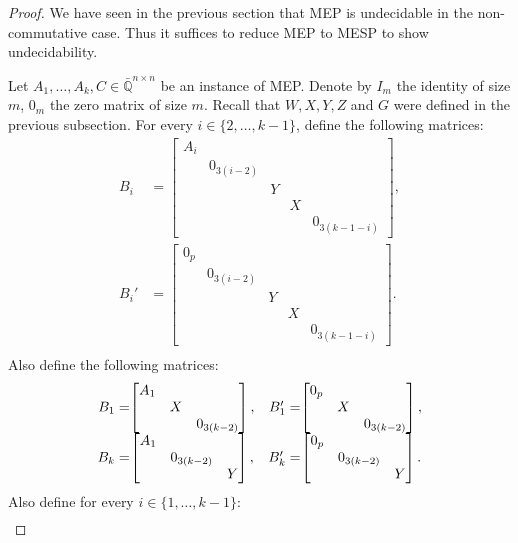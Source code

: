 \begin{proof}
We have seen in the previous section that MEP is undecidable in the non-commutative
case. Thus it suffices to reduce MEP to MESP to show undecidability.

Let $A_1,\ldots,A_k,C\in\bar{\mathbb{Q}}^{n\times n}$ be an instance of MEP. Denote by $I_m$ the identity of size $m$,
$0_m$ the zero matrix of size $m$. Recall that $W,X,Y,Z$ and $G$ were defined in the previous
subsection. For every $i\in\{2,\ldots,k-1\}$, define the following matrices:
\begin{align*}
B_i&=\begin{bmatrix}A_i&&&&\\&0_{3(i-2)}&&&\\&&Y&&\\&&&X&\\&&&&0_{3(k-1-i)}\end{bmatrix},\\
B_i'&=\begin{bmatrix}0_p&&&&\\&0_{3(i-2)}&&&\\&&Y&&\\&&&X&\\&&&&0_{3(k-1-i)}\end{bmatrix}.\\
\end{align*}
Also define the following matrices:
\[
\begin{array}{r@{}c@{}cr@{}c}
B_1=&\begin{bmatrix}A_1&&\\&X&\\&&0_{3(k-2)}\end{bmatrix},&&
B_1'=&\begin{bmatrix}0_p&&\\&X&\\&&0_{3(k-2)}\end{bmatrix},\\
B_k=&\begin{bmatrix}A_1&&\\&0_{3(k-2)}&\\&&Y\end{bmatrix},&&
B_k'=&\begin{bmatrix}0_p&&\\&0_{3(k-2)}&\\&&Y\end{bmatrix}.\\
\end{array}\]
Also define for every $i\in\{1,\ldots,k-1\}$:
\begin{align*}

\end{align*}
\end{proof}
